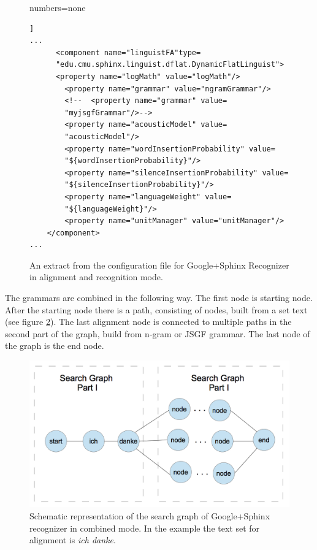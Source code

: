 \begin{figure}[htbp]
  \centering 
 
{numbers=none}  
\lstset{language=XML}  
\begin{lstlisting}[frame=single]]
...
      <component name="linguistFA"type=
      "edu.cmu.sphinx.linguist.dflat.DynamicFlatLinguist"> 
      <property name="logMath" value="logMath"/>
        <property name="grammar" value="ngramGrammar"/> 
        <!--  <property name="grammar" value=
        "myjsgfGrammar"/>--> 
        <property name="acousticModel" value=
        "acousticModel"/>
        <property name="wordInsertionProbability" value=
        "${wordInsertionProbability}"/>
        <property name="silenceInsertionProbability" value=
        "${silenceInsertionProbability}"/>
        <property name="languageWeight" value=
        "${languageWeight}"/>
        <property name="unitManager" value="unitManager"/>
    </component>
...
\end{lstlisting} 
 \caption{An extract from the configuration file for Google+Sphinx Recognizer in
 alignment and recognition mode.}
  \label{fig:conf_al_rec}
\end {figure}

The grammars are combined in the following way. The first node is
starting node. After the starting node there is a path, consisting of nodes,
built from a set text (see figure  \ref{fig:graph}). The last alignment
node is connected to multiple paths in the second part of the graph, build from n-gram
or JSGF grammar. The last node of the graph is the end node.
\begin{figure}[htbp]
  \centering
    \includegraphics[width=1.0\textwidth]{images/searchgraph.png}
 \caption{Schematic representation of the search graph of Google+Sphinx
 recognizer in combined mode. In the example the text set for alignment is
 \textit {ich danke}.}
  \label{fig:graph}
\end {figure}

